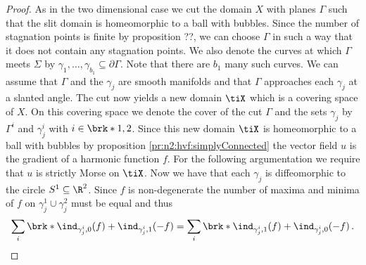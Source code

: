 \begin{proof}
  As in the two dimensional case we cut the domain $X$ with planes $\Gamma$ such that the slit domain is
  homeomorphic to a ball with bubbles.
  Since the number of stagnation points is finite by proposition ??, we can choose $\Gamma$ in such a way
  that it does not contain any stagnation points. We also denote the curves at which $\Gamma$ meets $\Sigma$ by 
  $\gamma_1,\dots,\gamma_{b_1}\subseteq\partial\Gamma$. Note that there are $b_1$ many such curves.
  We can assume that $\Gamma$ and the $\gamma_j$ are smooth manifolds and that $\Gamma$ approaches
  each $\gamma_j$ at a slanted angle.
  The cut now yields a new domain $\tiX$ which is a covering space of $X$.
  On this covering space we denote the cover of the cut $\Gamma$ and the sets $\gamma_j$ by
  $\Gamma^i$ and $\gamma_j^i$ with $i\in\brk*{1,2}$.
  Since this new domain $\tiX$ is homeomorphic to a ball with bubbles by proposition \ref{pr:n2:hvf:simplyConnected}
  the vector field $u$ is the gradient of a harmonic function $f$.
  For the following argumentation we require that $u$ is strictly Morse on $\tiX$.
  Now we have that each $\gamma_j$ is diffeomorphic to the circle $S^1\subseteq\R^2$.
  Since $f$ is non-degenerate the number of maxima and minima of $f$ on $\gamma_j^1\cup\gamma_j^2$ must be equal and thus
  \begin{align}
    \sum_i\brk*{\ind_{\gamma_j^i,0}(f)+\ind_{\gamma_j^i,1}(-f)}=\sum_i\brk*{\ind_{\gamma_j^i,1}(f)+\ind_{\gamma_j^i,0}(-f)}\,.
    \label{eq:n3_hvf_noInflowNoOutflow_maxMinRel}
  \end{align}


\end{proof}
